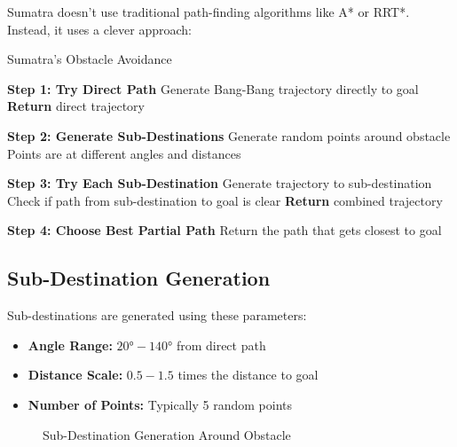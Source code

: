 \documentclass[12pt,a4paper]{article}
\begin{document}
Sumatra doesn't use traditional path-finding algorithms like A* or RRT*. Instead, it uses a clever approach:

\begin{algorithm}
\caption{Sumatra's Obstacle Avoidance}
\begin{algorithmic}
\STATE \textbf{Step 1: Try Direct Path}
\STATE Generate Bang-Bang trajectory directly to goal
    \STATE \textbf{Return} direct trajectory
\ENDIF

\STATE \textbf{Step 2: Generate Sub-Destinations}
    \STATE Generate random points around obstacle
    \STATE Points are at different angles and distances
\ENDFOR

\STATE \textbf{Step 3: Try Each Sub-Destination}
    \STATE Generate trajectory to sub-destination
        \STATE Check if path from sub-destination to goal is clear
            \STATE \textbf{Return} combined trajectory
        \ENDIF
    \ENDIF
\ENDFOR

\STATE \textbf{Step 4: Choose Best Partial Path}
\STATE Return the path that gets closest to goal
\end{algorithmic}
\end{algorithm}

\subsection{Sub-Destination Generation}

Sub-destinations are generated using these parameters:
\begin{itemize}
    \item \textbf{Angle Range:} $20° - 140°$ from direct path
    \item \textbf{Distance Scale:} $0.5 - 1.5$ times the distance to goal
    \item \textbf{Number of Points:} Typically 5 random points
\end{itemize}

\begin{figure}[H]
\centering
{}
\caption{Sub-Destination Generation Around Obstacle}
\end{figure}
\end{document}
